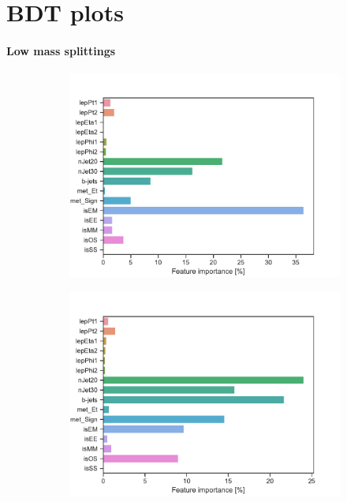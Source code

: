 \chapter{BDT plots}
\label{sec:appBDTplots}


\subsubsection{Low mass splittings}
\begin{figure}[H]
    \centering
    \begin{subfigure}[t!]{0.49\textwidth}
        \includegraphics[width = \textwidth]{Figures/SlepSlep/ML/BDT/Low_level/Low/featureImportance.pdf}
        \caption{}
        \label{fig:featSlepslepLow}
    \end{subfigure}
    \begin{subfigure}[t!]{0.49\textwidth}
        \includegraphics[width = \textwidth]{Figures/SlepSnu/BDT/Low_level/Low/featureImportance.pdf}

\end{subfigure}
\end{figure}
